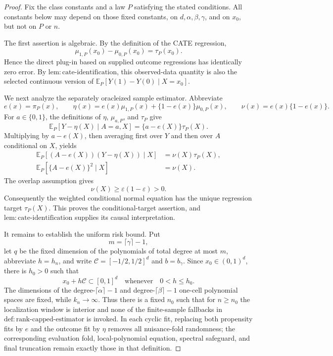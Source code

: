 \documentclass{article}
\begin{document}
\begin{proof}
Fix the class constants and a law \(P\) satisfying the stated conditions.  All constants below may depend on those fixed constants, on \(d,\alpha,\beta,\gamma\), and on \(x_0\), but not on \(P\) or \(n\).

The first assertion is algebraic.  By the definition of the CATE regression,
\[
\mu_{1,P}(x_0)-\mu_{0,P}(x_0)=\tau_P(x_0).
\]
Hence the direct plug-in based on supplied outcome regressions has identically zero error.  By \(\mathrm{lem:cate\mbox{-}identification}\), this observed-data quantity is also the selected continuous version of \(\mathbb E_P[Y(1)-Y(0)\mid X=x_0]\).

We next analyze the separately oracleized sample estimator.  Abbreviate
\[
e(x)=\pi_P(x),\qquad
\eta(x)=e(x)\mu_{1,P}(x)+\{1-e(x)\}\mu_{0,P}(x),
\qquad
\nu(x)=e(x)\{1-e(x)\}.
\]
For \(a\in\{0,1\}\), the definitions of \(\eta\), \(\mu_{a,P}\), and \(\tau_P\) give
\[
\mathbb E_P[Y-\eta(X)\mid A=a,X]
=\{a-e(X)\}\tau_P(X).
\]
Multiplying by \(a-e(X)\), then averaging first over \(Y\) and then over \(A\) conditional on \(X\), yields
\[
\begin{aligned}
\mathbb E_P[(A-e(X))(Y-\eta(X))\mid X]
&=\nu(X)\tau_P(X),\\
\mathbb E_P[\{A-e(X)\}^2\mid X]
&=\nu(X).
\end{aligned}
\]
The overlap assumption gives
\[
\nu(X)\geq\varepsilon(1-\varepsilon)>0.
\]
Consequently the weighted conditional normal equation has the unique regression target \(\tau_P(X)\).  This proves the conditional-target assertion, and \(\mathrm{lem:cate\mbox{-}identification}\) supplies its causal interpretation.

It remains to establish the uniform risk bound.  Put
\[
m=\lceil\gamma\rceil-1,
\]
let \(q\) be the fixed dimension of the polynomials of total degree at most \(m\), abbreviate \(h=h_n\), and write \(\mathcal C=[-1/2,1/2]^d\) and \(b=b_\gamma\).  Since \(x_0\in(0,1)^d\), there is \(h_0>0\) such that
\[
x_0+h\mathcal C\subset[0,1]^d
\quad\text{whenever}\quad 0<h\leq h_0.
\]
The dimensions of the degree-\(\lceil\alpha\rceil-1\) and degree-\(\lceil\beta\rceil-1\) one-cell polynomial spaces are fixed, while \(k_n\to\infty\).  Thus there is a fixed \(n_0\) such that for \(n\geq n_0\) the localization window is interior and none of the finite-sample fallbacks in \(\mathrm{def:rank\mbox{-}capped\mbox{-}estimator}\) is invoked.  In each cyclic fit, replacing both propensity fits by \(e\) and the outcome fit by \(\eta\) removes all nuisance-fold randomness; the corresponding evaluation fold, local-polynomial equation, spectral safeguard, and final truncation remain exactly those in that definition.


\end{proof}
\end{document}
